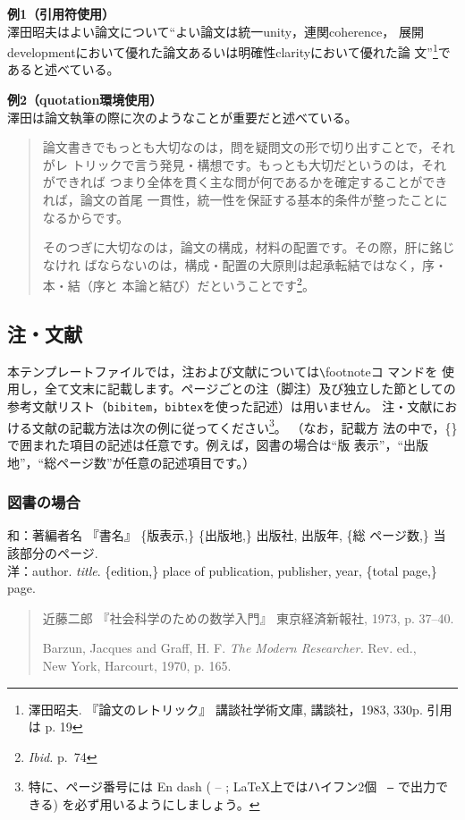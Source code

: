 \documentclass[b5paper,10pt,twocolumn,tombow]{jarticle}
\begin{document}
\noindent{}\textbf{例1（引用符使用）}\\
澤田昭夫はよい論文について``よい論文は統一unity，連関coherence，
展開developmentにおいて優れた論文あるいは明確性clarityにおいて優れた論
文''\footnote{澤田昭夫. 『論文のレトリック』 講談社学術文庫, 講談社，1983, 330p. 引用は
p. 19}であると述べている。

\noindent{}\textbf{例2（quotation環境使用）}\\
澤田は論文執筆の際に次のようなことが重要だと述べている。
\begin{quotation}
  論文書きでもっとも大切なのは，問を疑問文の形で切り出すことで，それがレ
  トリックで言う発見・構想です。もっとも大切だというのは，それができれば
  つまり全体を貫く主な問が何であるかを確定することができれば，論文の首尾
  一貫性，統一性を保証する基本的条件が整ったことになるからです。

  そのつぎに大切なのは，論文の構成，材料の配置です。その際，肝に銘じなけれ
  ばならないのは，構成・配置の大原則は起承転結ではなく，序・本・結（序と
  本論と結び）だということです\footnote{\textit{Ibid.} p.~74}。
\end{quotation}


\subsection{注・文献} \label{123950_27Oct08}
本テンプレートファイルでは，注および文献については\verb|\|footnoteコ
マンドを
使用し，全て文末に記載します。ページごとの注（脚注）及び独立した節としての参考文献リスト（\texttt{bibitem}，\texttt{bibtex}を使った記述）は用いません。
注・文献における文献の記載方法は次の例に従ってください\footnote{特に、ページ番号には En dash ( -- ; \LaTeX 上ではハイフン2個 \texttt{ --} で出力できる) を必ず用いるようにしましょう。}。
（なお，記載方
法の中で，\{\}で囲まれた項目の記述は任意です。例えば，図書の場合は``版
表示''，``出版地''，``総ページ数''が任意の記述項目です。）

\subsubsection{図書の場合}
\noindent{}和：著編者名 『書名』 \{版表示,\} \{出版地,\} 出版社, 出版年, \{総
\bigskip
ページ数,\} 当該部分のページ.\\
洋：author. \textit{title}. \{edition,\} place of publication,
publisher, year, \{total page,\} page.
\begin{quote}
 近藤二郎 『社会科学のための数学入門』 東京経済新報社, 1973,
 p. 37--40.

 Barzun, Jacques and Graff, H. F. \textit{The Modern Researcher.}
 Rev. ed., \\New York, Harcourt, 1970, p. 165.
\end{quote}
\end{document}
